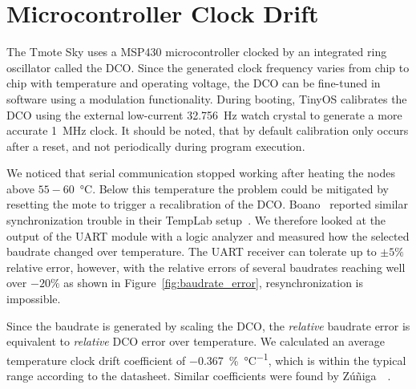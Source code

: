 \section{Microcontroller Clock Drift}
\label{sec:clock_drift}

The Tmote Sky uses a MSP430 microcontroller clocked by an integrated ring oscillator called the \ac{DCO}.
Since the generated clock frequency varies from chip to chip with temperature and operating voltage, the \ac{DCO} can be fine-tuned in software using a modulation functionality.
During booting, TinyOS calibrates the \ac{DCO} using the external low-current \SI{32.756}{\hertz} watch crystal to generate a more accurate \SI{1}{\mega\hertz} clock.
It should be noted, that by default calibration only occurs after a reset, and not periodically during program execution.

We noticed that serial communication stopped working after heating the nodes above $55-$\SI{60}{\celsius}. Below this temperature the problem could be mitigated by resetting the mote to trigger a recalibration of the \ac{DCO}.
Boano~\etal{} reported similar synchronization trouble in their TempLab setup~\cite{Boano2014}.
We therefore looked at the output of the \ac{UART} module with a logic analyzer and measured how the selected baudrate changed over temperature.
The \ac{UART} receiver can tolerate up to $\pm5\%$ relative error, however, with the relative errors of several baudrates reaching well over $-20\%$ as shown in Figure~\ref{fig:baudrate_error}, resynchronization is impossible.

Since the baudrate is generated by scaling the \ac{DCO}, the \emph{relative} baudrate error is equivalent to \emph{relative} \ac{DCO} error over temperature.
We calculated an average temperature clock drift coefficient of \SI{-0.367}{\%\per\celsius}, which is within the typical range according to the datasheet. Similar coefficients were found by Z{\'u}{\~n}iga~\etal~\cite{Zuniga2013}.

